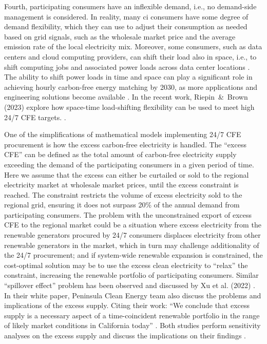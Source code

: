 \documentclass[11pt, 5p, nopreprintline]{elsarticle}
\begin{document}
Fourth, participating consumers have an inflexible demand, i.e., no demand-side management is considered.
In reality, many \gls{ci} consumers have some degree of demand flexibility, which they can use to adjust their consumption as needed based on grid signals, such as the wholesale market price and the average emission rate of the local electricity mix.
Moreover, some consumers, such as data centers and cloud computing providers, can shift their load also in space, i.e., to shift computing jobs and associated power loads across data center locations \cite{koningsteinWeNowMore2021}.
The ability to shift power loads in time and space can play a significant role in achieving hourly carbon-free energy matching by 2030, as more applications and engineering solutions become available \cite{radovanovicCarbonAwareComputingDatacenters2021,radovanovicIEEE2023,koningsteinWeNowMore2021}.
In the recent work, Riepin~\&~Brown (2023) explore how space-time load-shifting flexibility can be used to meet high 24/7 CFE targets. \cite{riepin-zenodo-spacetime247CFE}.

One of the simplifications of mathematical models implementing 24/7 CFE procurement is how the excess carbon-free electricity is handled.
The \enquote{excess CFE} can be defined as the total amount of carbon-free electricity supply exceeding the demand of the participating consumers in a given period of time.
Here we assume that the excess can either be curtailed or sold to the regional electricity market at wholesale market prices, until the excess constraint is reached.
The constraint restricts the volume of excess electricity sold to the regional grid, ensuring it does not surpass 20\% of the annual demand from participating consumers.
The problem with the unconstrained export of excess CFE to the regional market could be a situation where excess electricity from the renewable generators procured by 24/7 consumers displaces electricity from other renewable generators in the market, which in turn may challenge additionality of the 24/7 procurement; and if system-wide renewable expansion is constrained, the cost-optimal solution may be to use the excess clean electricity to \enquote{relax} the constraint, increasing the renewable portfolio of participating consumers.
Similar \enquote{spillover effect} problem has been observed and discussed by Xu et al. (2022) \cite{xu-247CFE-SSRN}.
In their white paper, Peninsula Clean Energy team also discuss the problems and implications of the excess supply. Citing their work: \enquote{We conclude that excess supply is a necessary aspect of a time-coincident renewable portfolio in the range of likely market conditions in California today} \cite{peninsula-report247}.
Both studies perform sensitivity analyses on the excess supply and discuss the implications on their findings \cite{xu-247CFE-SSRN, peninsula-report247}.
\end{document}
